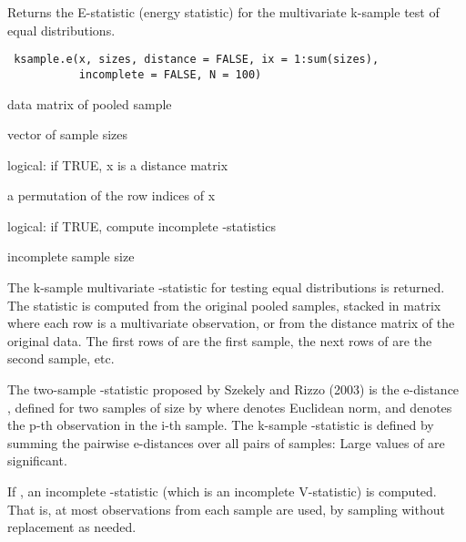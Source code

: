 \begin{Description}\relax
Returns the E-statistic (energy statistic)
for the multivariate k-sample test of equal distributions.
\end{Description}
\begin{Usage}
\begin{verbatim}
 ksample.e(x, sizes, distance = FALSE, ix = 1:sum(sizes), 
           incomplete = FALSE, N = 100)
\end{verbatim}
\end{Usage}
\begin{Arguments}
\begin{ldescription}
\item[\code{x}] data matrix of pooled sample
\item[\code{sizes}] vector of sample sizes
\item[\code{distance}] logical: if TRUE, x is a distance matrix
\item[\code{ix}] a permutation of the row indices of x 
\item[\code{incomplete}] logical: if TRUE, compute incomplete -statistics
\item[\code{N}] incomplete sample size
\end{ldescription}
\end{Arguments}
\begin{Details}\relax
The k-sample multivariate -statistic for testing equal distributions
is returned. The statistic is computed from the original pooled samples, stacked in 
matrix  where each row is a multivariate observation, or from the distance 
matrix  of the original data. The
first  rows of  are the first sample, the next
 rows of  are the second sample, etc.

The two-sample -statistic proposed by Szekely and Rizzo (2003)
is the e-distance , defined for two samples 
of size  by
where
\eqn{\|\cdot\|}{|| ||} denotes Euclidean norm, and  denotes the p-th observation in the i-th sample.  
The k-sample  
-statistic is defined by summing the pairwise e-distances over 
all  pairs 
of samples:
Large values of  are significant.

If , an incomplete -statistic (which is an
incomplete V-statistic) is computed. That is, at most
 observations from each sample are used, 
by sampling without replacement as needed.\end{Details}
